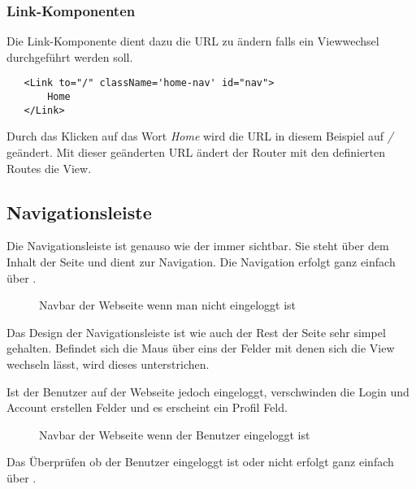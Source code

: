 \subsubsection{Link-Komponenten}
\label{React-Links}
Die Link-Komponente dient dazu die URL zu ändern falls ein Viewwechsel durchgeführt werden soll.
\begin{lstlisting}
   <Link to="/" className='home-nav' id="nav">
       Home
   </Link>
\end{lstlisting}
Durch das Klicken auf das Wort \textit{Home} wird die URL in diesem Beispiel auf \textit{/} geändert.
Mit dieser geänderten URL ändert der Router mit den definierten Routes die View.

\subsection{Navigationsleiste}
\label{nav}

Die Navigationsleiste ist genauso wie der  immer sichtbar. Sie steht über dem Inhalt der Seite und 
dient zur Navigation. Die Navigation erfolgt ganz einfach über .

\begin{figure}[H]
  \begin{center}
    \caption{Navbar der Webseite wenn man nicht eingeloggt ist}
  \end{center}
\end{figure}

Das Design der Navigationsleiste ist wie auch der Rest der Seite sehr simpel gehalten. Befindet sich
die Maus über eins der Felder mit denen sich die View wechseln lässt, wird dieses unterstrichen.


Ist der Benutzer auf der Webseite jedoch eingeloggt, verschwinden die Login und Account erstellen 
Felder und es erscheint ein Profil Feld.

\begin{figure}[H]
    \begin{center}
      \caption{Navbar der Webseite wenn der Benutzer eingeloggt ist}
    \end{center}
\end{figure}

\pagebreak

Das Überprüfen ob der Benutzer eingeloggt ist oder nicht erfolgt ganz einfach über .


